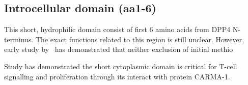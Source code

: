 \subsection{Introcellular domain (aa1-6)}

This short, hydrophilic domain consist of first 6 amino acids from DPP4 N-terminus. The exact functions related to this region is still unclear. However, early study by~\citet{Hong1990} has demonstrated that neither exclusion of initial methio

Study has demonstrated the short cytoplasmic domain is critical for T-cell signalling and proliferation through its interact with protein CARMA-1. \cite{Ohnuma_2007}
